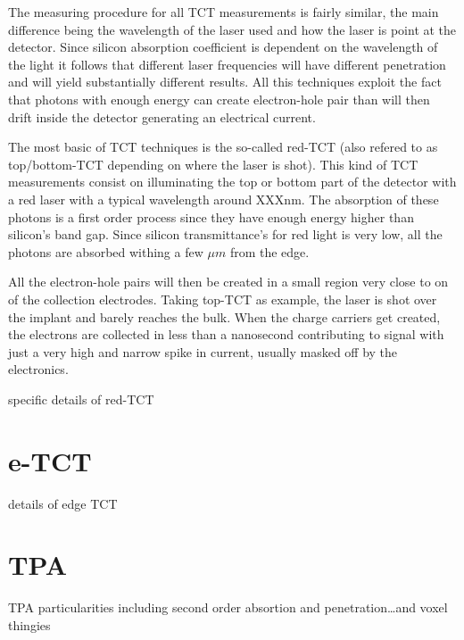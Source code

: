 The measuring procedure for all TCT measurements is fairly similar, the main difference being the wavelength of the laser used and how the laser is point at the detector. Since silicon absorption coefficient is dependent on the wavelength of the light it follows that different laser frequencies will have different penetration and will yield substantially different results. All this techniques exploit the fact that photons with enough energy can create electron-hole pair than will then drift inside the detector generating an electrical current. 

The most basic of TCT techniques is the so-called red-TCT (also refered to as top/bottom-TCT depending on where the laser is shot). This kind of TCT measurements consist on illuminating the top or bottom part of the detector with a red laser with a typical wavelength around XXXnm. The absorption of these photons is a first order process since they have enough energy higher than silicon's band gap. Since silicon transmittance's for red light is very low, all the photons are absorbed withing a few $\mu m$ from the edge. 

All the electron-hole pairs will then be created in a small region very close to on of the collection electrodes. Taking top-TCT as example, the laser is shot over the implant and barely reaches the bulk. When the charge carriers get created, the electrons are collected in less than a nanosecond contributing to signal with just a very high and narrow spike in current, usually masked off by the electronics.

specific details of red-TCT

\section{e-TCT} %
\label{sec:fitting_method}

details of edge TCT


\section{TPA} %
\label{sec:results_and_comparison_with_tracs_rad}

TPA particularities including second order absortion and penetration\ldots and voxel thingies


